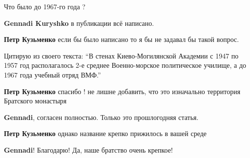  
 
 
 
 

Что было до 1967-го года ?

\textbf{Gennadi Kuryshko} в публикации всё написано.

\textbf{Петр Кузьменко} если бы было написано то я бы не задавал бы такой вопрос.

Цитирую из своего текста: \enquote{В стенах Киево-Могилянской Академии с 1947 по 1957 год располагалось 2-е среднее Военно-морское политическое училище, а до 1967 года учебный отряд ВМФ.}

\textbf{Петр Кузьменко} спасибо ! не лишне добавить, что это изначально территория Братского монастыря

\textbf{Gennadi}, согласен полностью. Только это прошлогодняя статья.

\textbf{Петр Кузьменко} однако название крепко прижилось в вашей среде

\textbf{Gennadi}! Благодарю! Да, наше братство очень крепкое!
